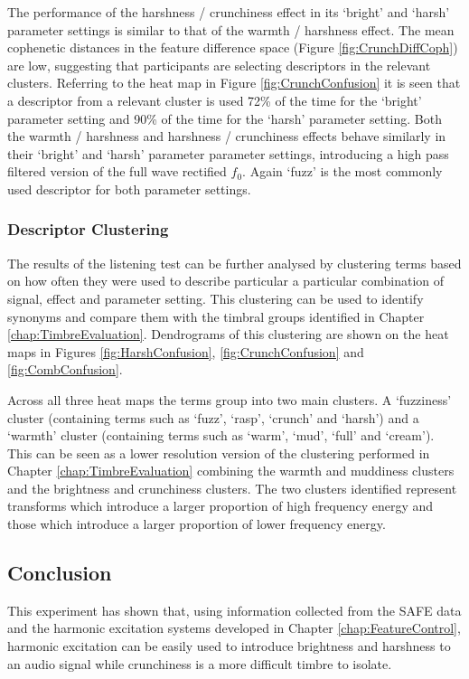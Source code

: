 			The performance of the harshness / crunchiness effect in its `bright' and `harsh' parameter
			settings is similar to that of the warmth / harshness effect. The mean cophenetic distances in the
			feature difference space (Figure \ref{fig:CrunchDiffCoph}) are low, suggesting that participants
			are selecting descriptors in the relevant clusters. Referring to the heat map in Figure
			\ref{fig:CrunchConfusion} it is seen that a descriptor from a relevant cluster is used 72\% of the
			time for the `bright' parameter setting and 90\% of the time for the `harsh' parameter setting.
			Both the warmth / harshness and harshness / crunchiness effects behave similarly in their `bright'
			and `harsh' parameter parameter settings, introducing a high pass filtered version of the full wave
			rectified $f_{0}$. Again `fuzz' is the most commonly used descriptor for both parameter settings.

		\subsubsection*{Descriptor Clustering}
			The results of the listening test can be further analysed by clustering terms based on how often
			they were used to describe particular a particular combination of signal, effect and parameter
			setting. This clustering can be used to identify synonyms and compare them with the timbral groups
			identified in Chapter \ref{chap:TimbreEvaluation}. Dendrograms of this clustering are shown on the
			heat maps in Figures \ref{fig:HarshConfusion}, \ref{fig:CrunchConfusion} and
			\ref{fig:CombConfusion}.

			Across all three heat maps the terms group into two main clusters. A `fuzziness' cluster
			(containing terms such as `fuzz', `rasp', `crunch' and `harsh') and a `warmth' cluster (containing
			terms such as `warm', `mud', `full' and `cream'). This can be seen as a lower resolution version of
			the clustering performed in Chapter \ref{chap:TimbreEvaluation} combining the warmth and muddiness
			clusters and the brightness and crunchiness clusters. The two clusters identified represent
			transforms which introduce a larger proportion of high frequency energy and those which introduce a
			larger proportion of lower frequency energy.

	\subsection{Conclusion}
	\label{sec:PerceptualExperiments-SemanticControl-Conclusion}
		This experiment has shown that, using information collected from the SAFE data and the harmonic excitation
		systems developed in Chapter \ref{chap:FeatureControl}, harmonic excitation can be easily used to introduce
		brightness and harshness to an audio signal while crunchiness is a more difficult timbre to isolate.

